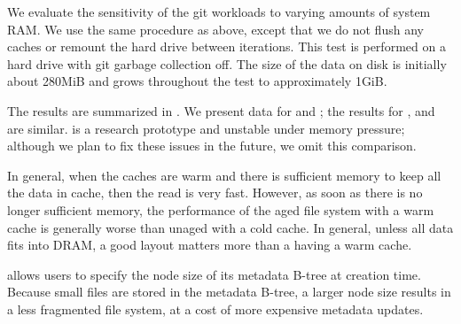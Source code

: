 We evaluate the sensitivity of the git workloads to varying amounts of system
RAM.  We use the same procedure as above, except that we do not flush any
caches or remount the hard drive between iterations.  This test is performed on
a hard drive with git garbage collection off.  The size of the data on disk is
initially about 280MiB and grows throughout the test to approximately 1GiB.



The results are summarized in . We present data for \ext
and \ftwofs; the results for \btrfs, \xfs and \zfs are similar. \betrfs is a
research prototype and unstable under memory pressure; although we plan to fix
these issues in the future, we omit this comparison.

In general, when the caches are warm and there is sufficient memory to keep all
the data in cache, then the read is very fast. However, as soon as there is no
longer sufficient memory, the performance of the aged file system with a warm
cache is generally worse than unaged with a cold cache.  In general, unless all
data fits into DRAM, a good layout matters more than a having a warm cache.
  
\Btrfs allows users to specify the node size of its metadata B-tree 
at creation time. Because small files are stored in the metadata
B-tree, a larger node size results in a less fragmented file system, at a cost of
more expensive metadata updates.

